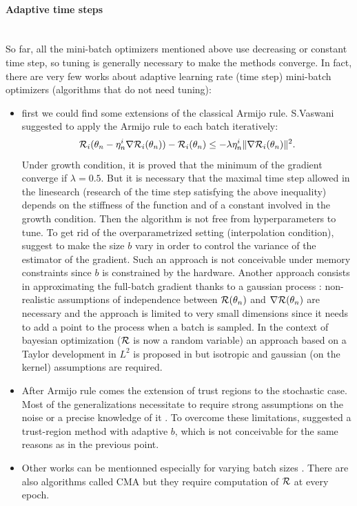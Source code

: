 \paragraph{Adaptive time steps}
~~\\
So far, all the mini-batch optimizers mentioned above use decreasing or constant time step, so tuning is generally necessary to make the methods converge. In fact, there are very few works about adaptive learning rate (time step) mini-batch optimizers (algorithms that do not need tuning):
\begin{itemize}
	\item first we could find some extensions of the classical Armijo rule. S.Vaswani \cite{stochastic_armijo} suggested to apply the Armijo rule to each batch iteratively:
	\begin{equation*}
		\mathcal{R}_i(\theta_n-\eta_n^i \nabla \mathcal{R}_i(\theta_n))-\mathcal{R}_i(\theta_n) \leq -\lambda \eta_n^i \|\nabla \mathcal{R}_i(\theta_n)\|^2.
	\end{equation*}
	Under growth condition, it is proved that the minimum of the gradient converge if $\lambda=0.5$. But it is necessary that the maximal time step allowed in the linesearch (research of the time step satisfying the above inequality) depends on the stiffness of the function and of a constant involved in the growth condition. Then the algorithm is not free from hyperparameters to tune. To get rid of the overparametrized setting (interpolation condition), \cite{armijo_batch_size,armijo_variance_reduction} suggest to make the size $b$ vary in order to control the variance of the estimator of the gradient. Such an approach is not conceivable under memory constraints since $b$ is constrained by the hardware. Another approach consists in approximating the full-batch gradient thanks to a gaussian process \cite{armijo_GP}: non-realistic assumptions of independence between $\mathcal{R}(\theta_n)$ and $\nabla \mathcal{R}(\theta_n)$ are necessary and the approach is limited to very small dimensions since it needs to add a point to the process when a batch is sampled. In the context of bayesian optimization ($\mathcal{R}$ is now a random variable) an approach based on a Taylor development in $L^2$ is proposed in \cite{armijo_L2} but isotropic and gaussian (on the kernel) assumptions are required. 
	\item After Armijo rule comes the extension of trust regions to the stochastic case. Most of the generalizations necessitate to require strong assumptions on the noise
          \cite{sto_TR_bounded} or a precise knowledge of it \cite{sto_TR_affine_noise,sto_TR_representative}. To overcome these limitations, \cite{sto_TR_sampling} suggested a
          trust-region method with adaptive $b$, which is not conceivable for the same reasons as in the previous point. %
	\item Other works can be mentionned especially for varying batch sizes \cite{adaptive_sampling,adaptive_batch,sgd_lauched}. There are also algorithms called CMA \cite{CMA,CMA_Light} but they require computation of $\mathcal{R}$ at every epoch.
\end{itemize} 

